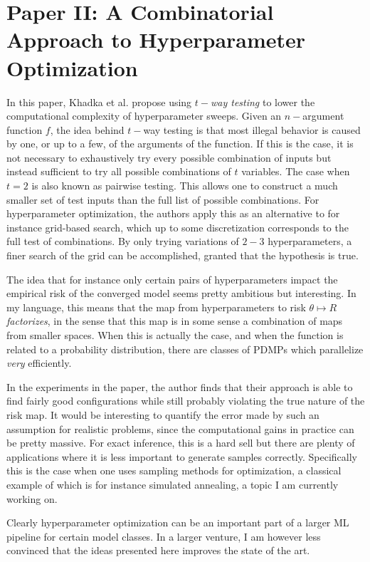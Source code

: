 \documentclass[11pt]{diazessay}
\begin{document}
\section*{Paper II: A Combinatorial Approach to Hyperparameter Optimization\cite{khadka2024combinatorial}}

In this paper, Khadka et al. propose using \textit{$t-$way testing} to lower the computational complexity of hyperparameter sweeps. Given an $n-$argument function $f$, the idea behind $t-$way testing is that most illegal behavior is caused by one, or up to a few, of the arguments of the function. If this is the case, it is not necessary to exhaustively try every possible combination of inputs but instead sufficient to try all possible combinations of $t$ variables. The case when $t=2$ is also known as pairwise testing. This allows one to construct a much smaller set of test inputs than the full list of possible combinations. For hyperparameter optimization, the authors apply this as an alternative to for instance grid-based search, which up to some discretization corresponds to the full test of combinations. By only trying variations of $2-3$ hyperparameters, a finer search of the grid can be accomplished, granted that the hypothesis is true.

The idea that for instance only certain pairs of hyperparameters impact the empirical risk of the converged model seems pretty ambitious but interesting. In my language, this means that the map from hyperparameters to risk $\theta \mapsto R$ \textit{factorizes}, in the sense that this map is in some sense a combination of maps from smaller spaces. When this is actually the case, and when the function is related to a probability distribution, there are classes of PDMPs which parallelize \textit{very} efficiently.

In the experiments in the paper, the author finds that their approach is able to find fairly good configurations while still probably violating the true nature of the risk map. It would be interesting to quantify the error made by such an assumption for realistic problems, since the computational gains in practice can be pretty massive. For exact inference, this is a hard sell but there are plenty of applications where it is less important to generate samples correctly. Specifically this is the case when one uses sampling methods for optimization, a classical example of which is for instance simulated annealing\cite{chiang1987}, a topic I am currently working on.

Clearly hyperparameter optimization can be an important part of a larger ML pipeline for certain model classes. In a larger venture, I am however less convinced that the ideas presented here improves the state of the art.



\end{document}

